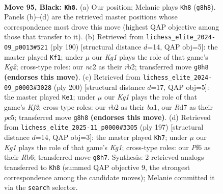 \documentclass[11pt]{article}
\begin{document}
\clearpage

\begin{figure}[p]\centering
\begin{subfigure}{0.46\textwidth}\centering
\resizebox{\linewidth}{!}{%
\newchessgame
\chessboard[
  setfen={6k1/3r2p1/5p2/7p/7P/6P1/1RN3K1/8 b - - 15 95},
  showmover=false,
  pgfstyle=straightmove, color=movearrow, markmove={g8-h8}
]}
\caption{}
\end{subfigure}\hfill
\begin{subfigure}{0.46\textwidth}\centering
\resizebox{\linewidth}{!}{%
\newchessgame
\chessboard[
  setfen={R7/6k1/6p1/7p/7P/5PP1/1r4K1/8 w - - 1 96},
  showmover=false,
  pgfstyle=straightmove, color=movearrow, markmove={g2-f1}
]}
\caption{}
\end{subfigure}
\\[4pt]
\begin{subfigure}{0.46\textwidth}\centering
\resizebox{\linewidth}{!}{%
\newchessgame
\chessboard[
  setfen={8/7k/B5p1/2p4p/5P1P/6P1/5K2/b7 w - - 24 101},
  showmover=false,
  pgfstyle=straightmove, color=movearrow, markmove={f2-e1}
]}
\caption{}
\end{subfigure}\hfill
\begin{subfigure}{0.46\textwidth}\centering
\resizebox{\linewidth}{!}{%
\newchessgame
\chessboard[
  setfen={6k1/6p1/1r5p/R6P/6P1/6K1/8/8 b - - 54 99},
  showmover=false,
  pgfstyle=straightmove, color=movearrow, markmove={g8-h7}
]}
\caption{}
\end{subfigure}
\caption{\textbf{Move 95, Black: \texttt{Kh8}.} (a) Our position; Melanie plays \texttt{Kh8} (\texttt{g8h8}). Panels (b)--(d) are the retrieved master positions whose correspondence most drove this move (highest QAP objective among those that transfer to it). (b) Retrieved from \texttt{lichess\_elite\_2024-09\_p0013\#521} (ply 190) [structural distance $d$=14, QAP obj=5]: the master played \texttt{Kf1}; under $\mu$ our \emph{Kg1} plays the role of that game's \emph{Kg2}; cross-type roles: our \emph{n}c2 as their \emph{r}b2; transferred move \texttt{g8h8} \textbf{(endorses this move)}. (c) Retrieved from \texttt{lichess\_elite\_2024-09\_p0003\#3028} (ply 200) [structural distance $d$=17, QAP obj=5]: the master played \texttt{Ke1}; under $\mu$ our \emph{Kg1} plays the role of that game's \emph{Kf2}; cross-type roles: our \emph{r}b2 as their \emph{b}a1, our \emph{R}d7 as their \emph{p}c5; transferred move \texttt{g8h8} \textbf{(endorses this move)}. (d) Retrieved from \texttt{lichess\_elite\_2025-11\_p0000\#3305} (ply 197) [structural distance $d$=14, QAP obj=3]: the master played \texttt{Kh7}; under $\mu$ our \emph{Kg1} plays the role of that game's \emph{Kg1}; cross-type roles: our \emph{P}f6 as their \emph{R}b6; transferred move \texttt{g8h7}. Synthesis: 2 retrieved analogs transferred to \texttt{Kh8} (summed QAP objective 9, the strongest correspondence among the candidate moves); Melanie committed it via the \texttt{search} selector.}
\label{fig:thought-m189}
\end{figure}
\end{document}
